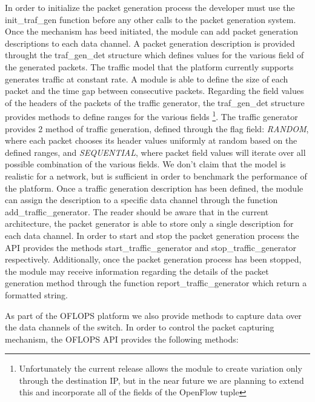 \documentclass{book}
\begin{document}
In order to initialize the packet generation process the developer must use the init\_traf\_gen function
before any other calls to the packet generation system. Once the mechanism has beed initiated, the module 
can add packet generation descriptions to each data channel. A packet generation description is provided 
throught the traf\_gen\_det structure which defines values for the various
field of the generated packets. The traffic model that the platform currently
supports generates traffic at constant rate. A module is able to define the
size of each packet and the time gap between consecutive packets. Regarding the
field values of the headers of the packets of the traffic generator, the
traf\_gen\_det structure provides methods to define ranges for the various
fields \footnote{Unfortunately the current release allows the module to create variation
only through the destination IP, but in the near future we are planning to
extend this and incorporate all of the fields of the OpenFlow tuple}. The
traffic generator provides 2 method of traffic generation, defined through the
flag field: \textit{RANDOM}, where each packet chooses its header values
uniformly at random based on the defined ranges, and \textit{SEQUENTIAL}, where
packet field values will iterate over all possible combination of the various
fields. We don't claim that the model is realistic for a network, but is
sufficient in order to benchmark the performance of the platform. Once a
traffic generation description has been defined, the module can assign the
description to a specific data channel through the function
add\_traffic\_generator. The reader should be aware that in the current
architecture, the packet generator is able to store only a single description
for each data channel. In order to start and stop the packet generation process
the API provides the methods start\_traffic\_generator and
stop\_traffic\_generator respectively. Additionally, once the packet generation
process has been stopped, the module may receive information regarding the
details of the packet generation method through the function
report\_traffic\_generator which return a formatted string. 

As part of the OFLOPS platform we also provide methods to capture data over the 
data channels of the switch. In order to control the packet capturing
mechanism, the OFLOPS API provides the following methods: 
\end{document}
